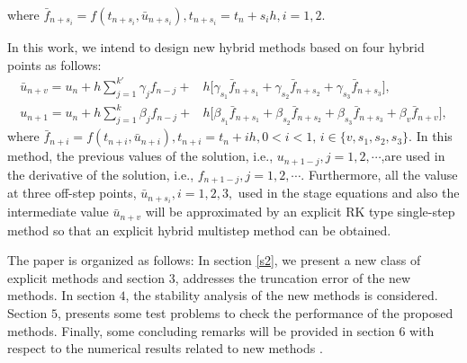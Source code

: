 \documentclass[11pt,twoside, final]{amsart}
\begin{document}
where
$ \bar{f}_{n+s_{i}}=f(t_{n+s_{i}},\bar{u}_{n+s_{i}}), t_{n+s_{i}}=t_{n}+s_{i} h, i=1,2.$
\par\noindent
In this work, we intend to design new hybrid methods based on four hybrid points as follows:
    \begin{align}
 \bar{u}_{n+v}=u_{n}+h\sum_{j=1}^{k'}\gamma_{j}f_{n-j}+ &  h\bigg[\gamma_{s_{1}}\bar{f}_{n+s_{1}}+\gamma_{s_{2}}\bar{f}_{n+s_{2}}+\gamma_{s_{3}}\bar{f}_{n+s_{3}}\bigg], \label{2.2}\\
u_{n+1}=u_{n}+h\sum_{j=1}^{k}\beta_{j}f_{n-j}+ &  h\bigg[\beta_{s_{1}}\bar{f}_{n+s_{1}}+\beta_{s_{2}}\bar{f}_{n+s_{2}}+\beta_{s_{3}}\bar{f}_{n+s_{3}}+\beta_{v}\bar{f}_{n+v}\bigg], \label{2.3}
\end{align}
where
 $ \bar{f}_{n+i}=f(t_{n+i},\bar{u}_{n+i}), t_{n+i}=t_{n}+i h, 0<i<1,\,i\in \{ v, s_{1}, s_{2}, s_{3}\}.$
 In this method,  the previous values ​​of the solution, i.e., $u_{n+1-j}, j=1,2,\cdots$,  ​​are used in the derivative of the solution, i.e., $f_{n+1-j}, j=1, 2,\cdots$. Furthermore,  all the valuse at three off-step points, $\bar{u}_{n+s_{i}},i=1, 2, 3,$ used ​​in the  stage equations  and  also the intermediate value $\bar{u}_{n+v}$ will be approximated by an explicit RK type single-step method so that an explicit hybrid multistep method can be obtained.

\noindent
The paper is organized as follows: In section \ref{s2}, we present a new class of explicit methods and section $3$,  addresses the truncation error of the new methods.
In section $4$,  the stability analysis of the new methods  is considered.
Section $5$,  presents some test problems to check the performance of the proposed methods.
    Finally, some concluding remarks will be provided in section $6$ with respect to the numerical results related to new methods  .
    
\end{document}
